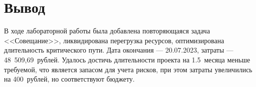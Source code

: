 \section{Вывод}

В ходе лабораторной работы была добавлена повторяющаяся задача <<Совещание>>,
ликвидирована перегрузка ресурсов, оптимизирована длительность критического
пути. Дата окончания --- 20.07.2023, затраты --- 48~509,69~рублей. Удалось
достичь длительности проекта на 1.5~месяца меньше требуемой, что является
запасом для учета рисков, при этом затраты увеличились на 400~рублей, но
соответствуют бюджету.

